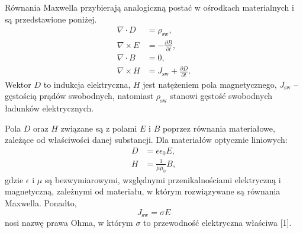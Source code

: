 \documentclass[12pt,a4paper]{article}
\begin{document}
Równania Maxwella przybierają analogiczną postać w ośrodkach materialnych i są
przedstawione poniżej.
\begin{align}
\nabla\cdot D &= \rho_{\mathrm{sw}}, \tag{2.2a}\\
\nabla\times E &= -\frac{\partial B}{\partial t}, \tag{2.2b}\\
\nabla\cdot B &= 0, \tag{2.2c}\\
\nabla\times H &= J_{\mathrm{sw}}+\frac{\partial D}{\partial t}. \tag{2.2d}
\end{align}
Wektor $D$ to indukcja elektryczna, $H$ jest natężeniem pola magnetycznego, $J_{\mathrm{sw}}$ -- gęstością prądów
swobodnych, natomiast $\rho_{\mathrm{sw}}$ stanowi gęstość swobodnych ładunków elektrycznych.

Pola $D$ oraz $H$ związane są z polami $E$ i $B$ poprzez równania materiałowe, zależące od
właściwości danej substancji. Dla materiałów optycznie liniowych:
\begin{align}
D &= \epsilon\epsilon_0E, \tag{2.3}\\
H &= \frac{1}{\mu\mu_0}B, \tag{2.4}
\end{align}
gdzie $\epsilon$ i $\mu$ są bezwymiarowymi, względnymi przenikalnościami elektryczną i magnetyczną,
zależnymi od materiału, w którym rozwiązywane są równania Maxwella. Ponadto,
\begin{equation}
J_{\mathrm{sw}}=\sigma E \tag{2.5}
\end{equation}
nosi nazwę prawa Ohma, w którym $\sigma$ to przewodność elektryczna właściwa [1].
\end{document}
